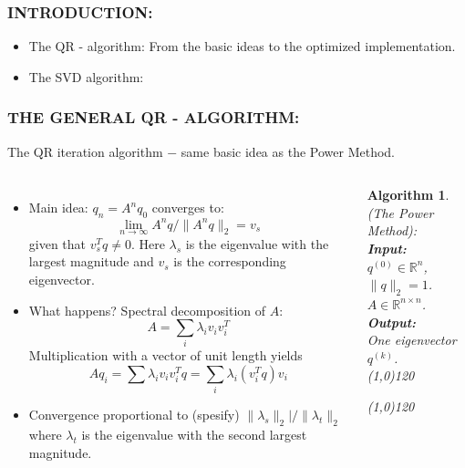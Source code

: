 \documentclass[a4paper,8pt]{beamer} %
\newcommand{\norm}[1]{\lVert{#1}\rVert}
\newtheorem{algo}{Algorithm}%
\begin{document}



\begin{frame}  %
\frametitle{INTRODUCTION:}
\begin{itemize}
\item The QR - algorithm: From the basic ideas to the optimized implementation.
\item The SVD algorithm: 
\end{itemize}
\end{frame} %

\begin{frame} %
\frametitle{THE GENERAL QR - ALGORITHM:}
The QR iteration algorithm $-$ same basic idea as the Power Method.
%
%
\begin{columns}
%
%
\column{7cm}
\begin{itemize}
	\item Main idea: $q_n = A^n q_0$ converges to: 
		\[ \lim_{n\to\infty} A^n q / \norm{A^nq}_2 = v_s \]
		given that $v_s^Tq\neq0$.
		Here $\lambda_s$ is the eigenvalue with the largest magnitude
		and $v_s$ is the corresponding eigenvector. 
	\item What happens? Spectral decomposition of $A$:
		\[ A = \sum_i\lambda_i v_iv_i^T \]
		 Multiplication with a vector of unit length yields 
		\[ Aq_i = \sum \lambda_i v_iv_i^T q = \sum_i \lambda_i (v_i^Tq) v_i \]
	\item Convergence proportional to (spesify) $\norm{\lambda_s}_2|/\norm{\lambda_t}_2$
		where $\lambda_t$ is the eigenvalue with the second largest magnitude.
\end{itemize}
%
%
\column{5cm}
\begin{algo}
{
%
	(The Power Method):
%
}\\
\textbf{Input: }
{
%
	\\$q^{(0)}\in\mathbb R^n$, $\norm{q}_2=1$.
	\\$A\in\mathbb R^{n\times n}$.
%
}\\
\textbf{Output: }
{
%
	\\One eigenvector $q^{(k)}$.
%
}\\
\line(1,0){120}
\begin{algorithmic}
%
	\State{$q^{(k)}\gets z/\norm{z}_2$}
\EndFor{}
%
\end{algorithmic}
\line(1,0){120}
\end{algo}
\end{columns}	
\end{frame} %
\end{document}
